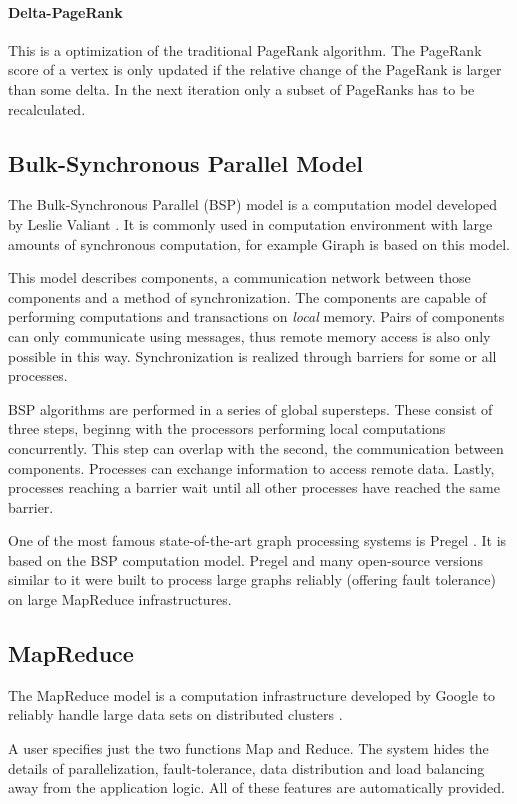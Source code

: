 \paragraph{Delta-PageRank}
This is a optimization of the traditional PageRank algorithm. The PageRank score of a vertex is only updated if the relative change of the PageRank is larger than some delta. In the next iteration only a subset of PageRanks has to be recalculated.

\subsection{Bulk-Synchronous Parallel Model}
\label{sec:bsp}
The Bulk-Synchronous Parallel (BSP) model is a computation model developed by Leslie Valiant \cite{bsp}. It is commonly used in computation environment with large amounts of synchronous computation, for example Giraph is based on this model.

This model describes components, a communication network between those components and a method of synchronization.
The components are capable of performing computations and transactions on \emph{local} memory. Pairs of components can only communicate using messages, thus remote memory access is also only possible in this way.
Synchronization is realized through barriers for some or all processes.

BSP algorithms are performed in a series of global supersteps. These consist of three steps, beginng with the processors performing local computations concurrently.
This step can overlap with the second, the communication between components. Processes can exchange information to access remote data.
Lastly, processes reaching a barrier wait until all other processes have reached the same barrier.

One of the most famous state-of-the-art graph processing systems is Pregel \cite{pregel}. It is based on the BSP computation model.
Pregel and many open-source versions similar to it were built to process large graphs reliably (offering fault tolerance) on large MapReduce infrastructures.

\subsection{MapReduce}
The MapReduce model is a computation infrastructure developed by Google to reliably handle large data sets on distributed clusters \cite{mapreduce}.

A user specifies just the two functions Map and Reduce.
The system hides the details of parallelization, fault-tolerance, data distribution and load balancing away from the application logic.
All of these features are automatically provided.


